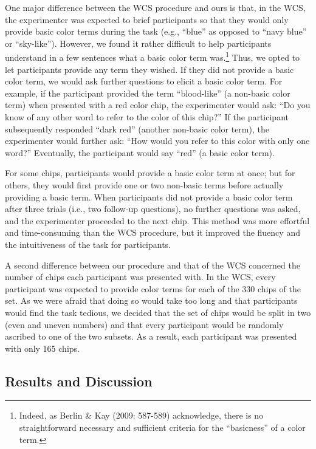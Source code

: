 \documentclass[floatsintext,man]{apa6}
\theoremstyle{definition}
\theoremstyle{definition}
\theoremstyle{definition}
\theoremstyle{remark}
\begin{document}
One major difference between the WCS procedure and ours is that, in the
WCS, the experimenter was expected to brief participants so that they
would only provide basic color terms during the task (e.g.,
\enquote{blue} as opposed to \enquote{navy blue} or \enquote{sky-like}).
However, we found it rather difficult to help participants understand in
a few sentences what a basic color term was.\footnote{Indeed, as Berlin
  \& Kay (2009: 587-589) acknowledge, there is no straightforward
  necessary and sufficient criteria for the \enquote{basicness} of a
  color term.} Thus, we opted to let participants provide any term they
wished. If they did not provide a basic color term, we would ask further
questions to elicit a basic color term. For example, if the participant
provided the term \enquote{blood-like} (a non-basic color term) when
presented with a red color chip, the experimenter would ask: \enquote{Do
you know of any other word to refer to the color of this chip?} If the
participant subsequently responded \enquote{dark red} (another non-basic
color term), the experimenter would further ask: \enquote{How would you
refer to this color with only one word?} Eventually, the participant
would say \enquote{red} (a basic color term).

For some chips, participants would provide a basic color term at once;
but for others, they would first provide one or two non-basic terms
before actually providing a basic term. When participants did not
provide a basic color term after three trials (i.e., two follow-up
questions), no further questions was asked, and the experimenter
proceeded to the next chip. This method was more effortful and
time-consuming than the WCS procedure, but it improved the fluency and
the intuitiveness of the task for participants.

A second difference between our procedure and that of the WCS concerned
the number of chips each participant was presented with. In the WCS,
every participant was expected to provide color terms for each of the
330 chips of the set. As we were afraid that doing so would take too
long and that participants would find the task tedious, we decided that
the set of chips would be split in two (even and uneven numbers) and
that every participant would be randomly ascribed to one of the two
subsets. As a result, each participant was presented with only 165
chips.

\subsection{Results and Discussion}\label{results-and-discussion}
\end{document}
